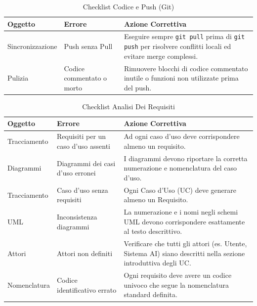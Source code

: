 \documentclass[11pt,a4paper]{article}
\begin{document}
\begin{table}[H]
    \centering
    \renewcommand{\arraystretch}{1.4}
    \begin{tabular}{|l|>{\raggedright\arraybackslash}p{}|>{\raggedright\arraybackslash}p{}|}
        \hline
        \textbf{Oggetto} & \textbf{Errore} & \textbf{Azione Correttiva} \\
        \hline
        Sincronizzazione & Push senza Pull & Eseguire sempre \texttt{git pull} prima di \texttt{git push} per risolvere conflitti locali ed evitare merge complessi. \\
        \hline
        Pulizia & Codice commentato o morto & Rimuovere blocchi di codice commentato inutile o funzioni non utilizzate prima del push. \\
        \hline
    \end{tabular}
    \caption{Checklist Codice e Push (Git)}
\end{table}

\begin{table}[H]
    \centering
    \renewcommand{\arraystretch}{1.4}
    \begin{tabular}{|l|>{\raggedright\arraybackslash}p{}|>{\raggedright\arraybackslash}p{}|}
        \hline
        \textbf{Oggetto} & \textbf{Errore} & \textbf{Azione Correttiva} \\
        \hline
        Tracciamento & Requisiti per un caso d'uso assenti & Ad ogni caso d'uso deve corrispondere almeno un requisito. \\
        \hline
        Diagrammi & Diagrammi dei casi d'uso erronei & I diagrammi devono riportare la corretta numerazione e nomenclatura del caso d'uso. \\
        \hline
        Tracciamento & Caso d'uso senza requisiti & Ogni Caso d'Uso (UC) deve generare almeno un Requisito. \\
        \hline
        UML & Inconsistenza diagrammi & La numerazione e i nomi negli schemi UML devono corrispondere esattamente al testo descrittivo. \\
        \hline
        Attori & Attori non definiti & Verificare che tutti gli attori (es. Utente, Sistema AI) siano descritti nella sezione introduttiva degli UC. \\
        \hline
        Nomenclatura & Codice identificativo errato & Ogni requisito deve avere un codice univoco che segue la nomenclatura standard definita. \\
        \hline
    \end{tabular}
    \caption{Checklist Analisi Dei Requisiti}
\end{table}
\end{document}
